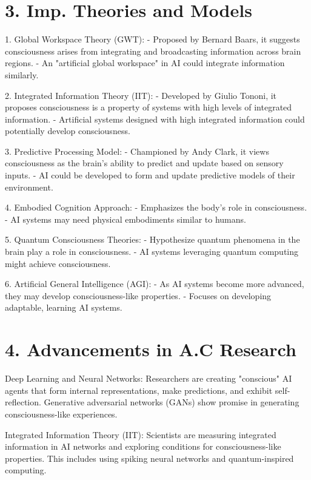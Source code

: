 \documentclass{article}
\begin{document}
\section*{3. Imp. Theories and Models}
1. Global Workspace Theory (GWT): - Proposed by Bernard Baars, it suggests consciousness arises from integrating and broadcasting information across brain regions.
   - An "artificial global workspace" in AI could integrate information similarly.

2. Integrated Information Theory (IIT):   - Developed by Giulio Tononi, it proposes consciousness is a property of systems with high levels of integrated information.
   - Artificial systems designed with high integrated information could potentially develop consciousness.

3. Predictive Processing Model: - Championed by Andy Clark, it views consciousness as the brain's ability to predict and update based on sensory inputs.
   - AI could be developed to form and update predictive models of their environment.

4. Embodied Cognition Approach: - Emphasizes the body's role in consciousness.
   - AI systems may need physical embodiments similar to humans.

5. Quantum Consciousness Theories: - Hypothesize quantum phenomena in the brain play a role in consciousness.
   - AI systems leveraging quantum computing might achieve consciousness.

6. Artificial General Intelligence (AGI): - As AI systems become more advanced, they may develop consciousness-like properties.
   - Focuses on developing adaptable, learning AI systems.


\section*{4. Advancements in A.C Research}

Deep Learning and Neural Networks:
Researchers are creating "conscious" AI agents that form internal representations, make predictions, and exhibit self-reflection. Generative adversarial networks (GANs) show promise in generating consciousness-like experiences.

Integrated Information Theory (IIT):
Scientists are measuring integrated information in AI networks and exploring conditions for consciousness-like properties. This includes using spiking neural networks and quantum-inspired computing.
\end{document}
